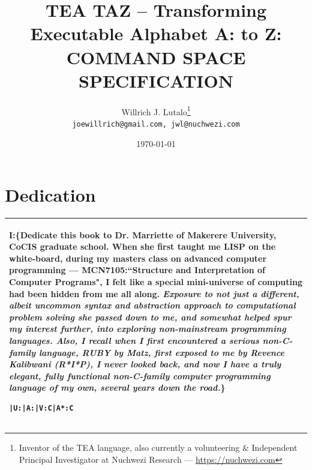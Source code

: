 \documentclass[a4paper, 18pt]{book} %
\title{\textbf{TEA TAZ} – \textbf{T}ransforming \textbf{E}xecutable \textbf{A}lphabet A: to Z: COMMAND SPACE SPECIFICATION}
\author{Willrich J. Lutalo\thanks{Inventor of the TEA language, also currently a volunteering \& Independent Principal Investigator at Nuchwezi Research --- \url{https://nuchwezi.com}}\\
\texttt{joewillrich@gmail.com, jwl@nuchwezi.com}}
\date{\today}
\begin{document}
\frontmatter








\maketitle

\chapter*{Dedication}


\begin{table}[H]
  \centering
  \LARGE
	\begin{tabular}[t]{|p{}}
I:\{\textbf{Dedicate this book to Dr. Marriette of Makerere University, CoCIS graduate school.} When she first taught me LISP on the white-board, during my masters class on advanced computer programming --- \textbf{MCN7105}:``Structure and Interpretation of Computer Programs", I felt like a special mini-universe of computing had been hidden from me all along. \textit{Exposure to not just a different, albeit uncommon syntax and abstraction approach to computational problem solving she passed down to me, and somewhat helped spur my interest further, into exploring non-mainstream programming languages. Also, I recall when I first encountered a serious non-C-family language, RUBY by Matz, first exposed to me by Revence Kalibwani (R*I*P), I never looked back, and now I have a truly elegant, fully functional non-C-family computer programming language of my own, several years down the road.}\}
\begin{verbatim}
|U:|A:|V:C|A*:C 
\end{verbatim}
\\
	\hline
	              
\end{tabular}
  \label{TABDEDC}
\end{table}

\tableofcontents

\listoffigures

\listoftables

\newpage

\Large



\end{document}
